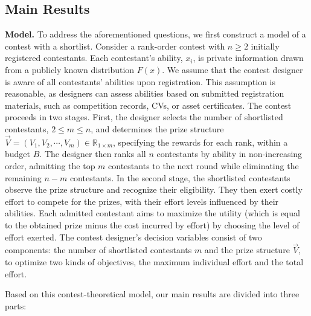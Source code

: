
\subsection{Main Results}

\noindent \textbf{Model.} 
To address the aforementioned questions, we first construct a model of a contest with a shortlist. Consider a rank-order contest with $n \geq 2$ initially registered contestants. Each contestant’s ability, $x_i$, is private information drawn from a publicly known distribution $F(x)$. We assume that the contest designer is aware of all contestants' abilities upon registration. This assumption is reasonable, as designers can assess abilities based on submitted registration materials, such as competition records, CVs, or asset certificates.
The contest proceeds in two stages. First, the designer selects the number of shortlisted contestants, $2 \leq m\leq n$, and determines the prize structure  $\vec{V}=(V_1,V_2, \cdots, V_m) \in \mathbb{R}_{1\times m}$, specifying the rewards for each rank, within a budget $B$. The designer then ranks all $n$ contestants by ability in non-increasing order, admitting the top $m$ contestants to the next round while eliminating the remaining $n-m$ contestants. In the second stage, the shortlisted contestants observe the prize structure and recognize their eligibility. They then exert costly effort to compete for the prizes, with their effort levels influenced by their abilities. Each admitted contestant aims to maximize the utility (which is equal to the obtained prize minus the cost incurred by effort) by choosing the level of effort exerted.
The contest designer's decision variables consist of two components: the number of shortlisted contestants $m$ and the prize structure $\vec{V}$, to optimize two kinds of objectives, the maximum individual effort and the total effort.

Based on this contest-theoretical model, our main results are divided into three parts:
